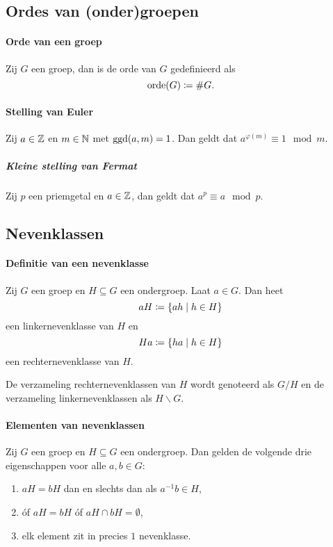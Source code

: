 \subsection{Ordes van (onder)groepen}
\paragraph{Orde van een groep} Zij \(G\) een groep, dan is de orde van \(G\) gedefinieerd als
\[
    \operatorname{orde}(G)\coloneqq\#G.
\]

\paragraph{Stelling van Euler} Zij \(a\in\mathbb{Z}\) en \(m\in\mathbb{N}\) met \(\operatorname{ggd}(a,m)=1\). Dan geldt dat \(a^{\varphi(m)}\equiv 1\mod m\).

\subparagraph{Kleine stelling van Fermat} Zij \(p\) een priemgetal en \(a\in\mathbb{Z}\), dan geldt dat \(a^{p}\equiv a\mod p\).

\subsection{Nevenklassen}
\paragraph{Definitie van een nevenklasse} Zij \(G\) een groep en \(H\subseteq G\) een ondergroep. Laat \(a\in G\). Dan heet
\[
    aH\coloneqq\{ah\mid h\in H\}
\]
een linkernevenklasse van \(H\) en
\[
    Ha\coloneqq\{ha\mid h\in H\}
\]
een rechternevenklasse van \(H\).

De verzameling rechternevenklassen van \(H\) wordt genoteerd als \(G/H\) en de verzameling linkernevenklassen als \(H\backslash G\).

\paragraph{Elementen van nevenklassen} Zij \(G\) een groep en \(H\subseteq G\) een ondergroep. Dan gelden de volgende drie eigenschappen voor alle \(a,b\in G\):
\begin{enumerate}
    \item \(aH=bH\) dan en slechts dan als \(a^{-1}b\in H\),
    \item óf \(aH=bH\) óf \(aH\cap bH=\emptyset\),
    \item elk element zit in precies \(1\) nevenklasse.
\end{enumerate}

